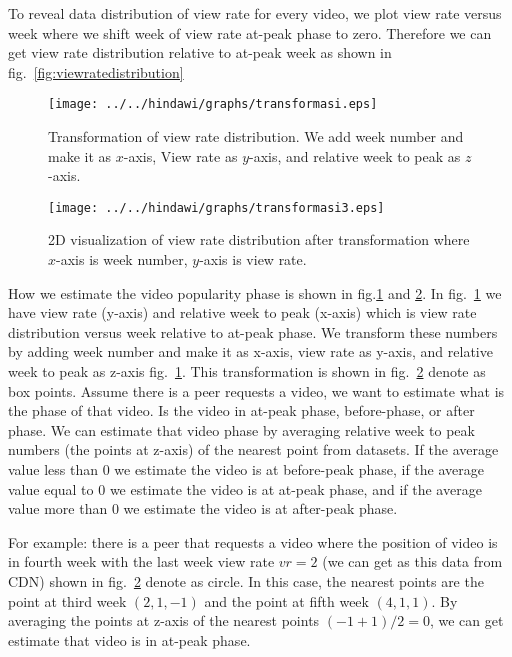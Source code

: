To reveal data distribution of view rate for every video, we plot view rate versus week where we shift week of view rate at-peak phase to zero. 
Therefore we can get view rate distribution relative to at-peak week as shown in fig.~\ref{fig:viewratedistribution}


\begin{figure}[!t]
\begin{center}
\texttt{[image: ../../hindawi/graphs/transformasi.eps]}
\end{center}
\caption{Transformation of view rate distribution. We add week number and make it as $x$-axis, View rate as $y$-axis, and relative week to peak as $z$-axis.}
\label{fig:viewratedistexample}
\end{figure} 

\begin{figure}[!t]
\begin{center}
\texttt{[image: ../../hindawi/graphs/transformasi3.eps]}
\end{center}
\caption{2D visualization of view rate distribution after transformation where $x$-axis is week number, $y$-axis is view rate.}
\label{fig:viewratedistexamplered}
\end{figure} 

How we estimate the video popularity phase is shown in fig.\ref{fig:viewratedistexample} and \ref{fig:viewratedistexamplered}.
In fig.~\ref{fig:viewratedistexample} we have view rate (y-axis) and relative week to peak (x-axis) which is view rate distribution versus week relative to at-peak phase.
We transform these numbers by adding week number and make it as x-axis, view rate 
as y-axis, and relative week to peak as z-axis fig.~\ref{fig:viewratedistexample}.
This transformation is shown in fig.~\ref{fig:viewratedistexamplered} denote as box points.
Assume there is a peer requests a video, we want to estimate what is the phase of that video. 
Is the video in at-peak phase, before-phase, or after phase.  
We can estimate that video phase by averaging relative week to peak numbers (the points at z-axis) of the nearest point from datasets. 
If the average value less than $0$ we estimate the video is at before-peak phase, if the average value equal to $0$ we estimate the video is at at-peak phase,  and if the average value more than $0$ we estimate the video is at after-peak phase.

For example: there is a peer that requests a video where the position of video is in fourth week with the last week view rate $vr=2$ (we can get as this data from CDN) shown in fig.~\ref{fig:viewratedistexamplered} denote as circle.
In this case, the nearest points are the point at third week $(2,1,-1)$ and the point at fifth week $(4,1,1)$.  
By averaging the points at z-axis of the nearest points $(-1 + 1)/2 = 0$,  we can get estimate that video is in at-peak phase.




